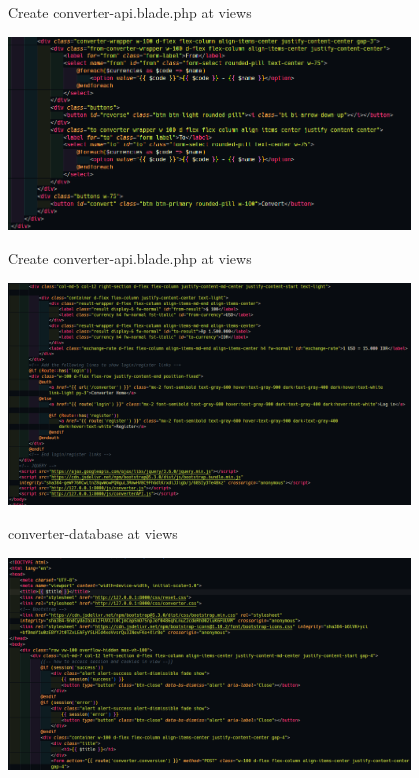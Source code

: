 \documentclass[aspectratio=169, table]{beamer}
\begin{document}
\begin{frame}{Create converter-api.blade.php at views}
    \vskip1cm
    \begin{center}
        \includegraphics[width=0.8\textwidth]{classFiles/pertemuan-13-converter-api-part-2.png}
    \end{center}
\end{frame}

\begin{frame}{Create converter-api.blade.php at views}
    \vskip1cm
    \begin{center}
        \includegraphics[width=0.8\textwidth]{classFiles/pertemuan-13-converter-api-part-3.png}
    \end{center}
\end{frame}

\begin{frame}{converter-database at views}
 \vskip1cm
 \begin{center}
  \includegraphics[width=0.8\textwidth]{classFiles/pertemuan-13-converter-database-part-1.png}
 \end{center}
\end{frame}
\end{document}
